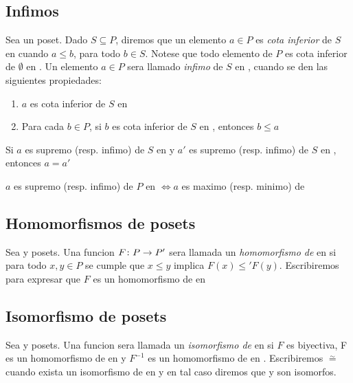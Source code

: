 \subsection{Infimos}
Sea \poset un poset. Dado $S \subseteq P$, diremos que un elemento $a \in P$ es \emph{cota inferior} de $S$
en \poset cuando $a \leq b$, para todo $b \in S$. Notese que todo elemento de $P$ es cota inferior de $\emptyset$
en \poset. Un elemento $a \in P$ sera llamado \emph{infimo} de $S$ en \poset, cuando se den las siguientes propiedades:
\begin{enumerate}
  \item $a$ es cota inferior de $S$ en \poset
  \item Para cada $b \in P$, si $b$ es cota inferior de $S$ en \poset, entonces $b \leq a$
\end{enumerate}
\begin{remark}
  Si $a$ es supremo (resp. infimo) de $S$ en \poset y $a'$ es supremo (resp. infimo) de $S$ en \poset, entonces $a = a'$
\end{remark}
\begin{remark}
  $a$ es supremo (resp. infimo) de $P$ en \poset $\iff a$ es maximo (resp. minimo) de \poset
\end{remark}

\subsection{Homomorfismos de posets}
\begin{definition}
Sea \poset y  posets. Una funcion $F\colon P\rightarrow P'$ sera llamada un \emph{homomorfismo de } \poset
en  si para todo $x, y \in P$ se cumple que $x \leq y$ implica $F(x) \leq' F(y)$.
Escribiremos  para expresar que $F$ es un homomorfismo
de \poset en 
\end{definition}

\subsection{Isomorfismo de posets}
\begin{definition}
  Sea \poset y  posets. Una funcion  sera llamada un \emph{isomorfismo de}
  \poset en  si $F$ es biyectiva, F es un homomorfismo de \poset en 
  y $F^{-1}$ es un homomorfismo de  en \poset. Escribiremos \poset $\overset{\sim}{=}$ 
  cuando exista un isomorfismo de \poset en  y en tal caso diremos que \poset y 
  son isomorfos.
\end{definition}

